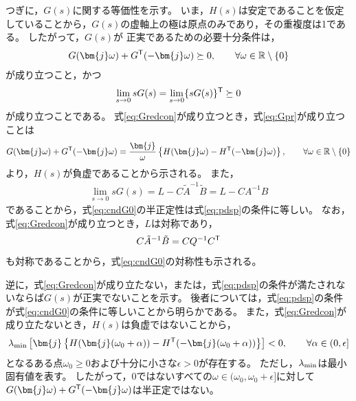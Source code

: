\documentclass[tombow,dvipdfmx]{corona-a5}
\begin{document}
\begin{証明}
つぎに，$G(s)$に関する等価性を示す。
いま，$H(s)$は安定であることを仮定していることから，$G(s)$の虚軸上の極は原点のみであり，その重複度は1である。
したがって，$G(s)$が
正実であるための必要十分条件は，
\begin{align}\label{eq:Gpr}
G(\bm{j}\omega) + G^{\sf T}(-\bm{j}\omega) \succeq 0
,\qquad \forall \omega \in \mathbb{R}\setminus\{0\}
\end{align}
が成り立つこと，かつ
\begin{align}\label{eq:cndG0}
\lim_{s\rightarrow 0} s G(s) = \lim_{s\rightarrow 0} \{ s G(s)\}^{\sf T}\succeq 0
\end{align}
が成り立つことである。
式\ref{eq:Gredcon}が成り立つとき，式\ref{eq:Gpr}が成り立つことは
\begin{align}\label{eq:NIineq}
G(\bm{j}\omega) + G^{\sf T}(-\bm{j}\omega)
=
\frac{\bm{j}}{\omega} \left\{
H(\bm{j}\omega) - H^{\sf T}(-\bm{j}\omega)
\right\}
,\qquad \forall \omega \in \mathbb{R}\setminus\{0\}
\end{align}
より，$H(s)$が負虚であることから示される。
また，
\begin{align*}
\lim_{s\rightarrow 0} s G(s) =
L - C\tilde{A}^{-1}\tilde{B} = L - C A^{-1} B
\end{align*}
であることから，式\ref{eq:cndG0}の半正定性は式\ref{eq:pdsp}の条件に等しい。
なお，式\ref{eq:Gredcon}が成り立つとき，$L$は対称であり，
\begin{align*}
C\tilde{A}^{-1}\tilde{B} = C Q^{-1} C^{\sf T}
\end{align*}
も対称であることから，式\ref{eq:cndG0}の対称性も示される。

逆に，式\ref{eq:Gredcon}が成り立たない，または，式\ref{eq:pdsp}の条件が満たされないならば$G(s)$が正実でないことを示す。
後者については，式\ref{eq:pdsp}の条件が式\ref{eq:cndG0}の条件に等しいことから明らかである。
また，式\ref{eq:Gredcon}が成り立たないとき，$H(s)$は負虚ではないことから，
\begin{align*}
\lambda_{\rm min}\left[
\bm{j}
\left\{
H(\bm{j}(\omega_0 + \alpha )) - H^{\sf T}(-\bm{j}(\omega_0 + \alpha ))
\right\}
\right] < 0
,\qquad
\forall \alpha \in (0,\epsilon] 
\end{align*}
となるある点$\omega_0\geq 0$および十分に小さな$\epsilon >0$が存在する。
ただし，$\lambda_{\rm min}$は最小固有値を表す。
したがって，0ではないすべての$\omega \in (\omega_0, \omega_0+\epsilon] $に対して
$G(\bm{j} \omega) + G^{\sf T}(-\bm{j} \omega) $は半正定ではない。
\end{証明}
\end{document}
